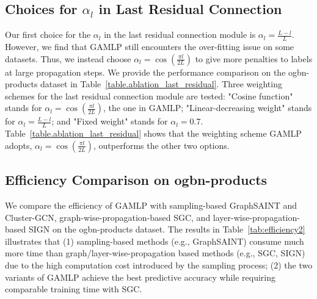 \documentclass[sigconf]{acmart}
\begin{document}
\subsection{Choices for $\alpha_l$ in Last Residual Connection}
Our first choice for the $\alpha_l$ in the last residual connection module is $\alpha_l=\frac{L-l}{L}$. However, we find that GAMLP still encounters the over-fitting issue on some datasets. Thus, we instead choose $\alpha_l=\cos(\frac{\pi l}{2L})$ to give more penalties to labels at large propagation steps.
We provide the performance comparison on the ogbn-products dataset in Table~\ref{table.ablation_last_residual}. Three weighting schemes for the last residual connection module are tested: "Cosine function" stands for $\alpha_l=\cos(\frac{\pi l}{2L})$, the one in GAMLP; "Linear-decreasing weight" stands for $\alpha_l=\frac{L-l}{L}$; and "Fixed weight" stands for $\alpha_l=0.7$. Table~\ref{table.ablation_last_residual} shows that the weighting scheme GAMLP adopts, $\alpha_l=\cos(\frac{\pi l}{2L})$, outperforms the other two options.


\subsection{Efficiency Comparison on ogbn-products}
We compare the efficiency of GAMLP with sampling-based GraphSAINT and Cluster-GCN, graph-wise-propagation-based SGC, and layer-wise-propagation-based SIGN on the ogbn-products dataset.
The results in Table~\ref{tab:efficiency2} illustrates that (1) sampling-based methods (e.g., GraphSAINT) consume much more time than graph/layer-wise-propagation based methods (e.g., SGC, SIGN) due to the high computation cost introduced by the sampling process;
(2) the two variants of GAMLP achieve the best predictive accuracy while requiring comparable training time with SGC.

\begin{table}[tpb!]
\caption{Ablation study of choices for $\alpha_l$ on ogbn-products.}
\centering
{
\noindent
\renewcommand{\multirowsetup}{\centering}
}
\label{table.ablation_last_residual}
\end{table}
\end{document}
